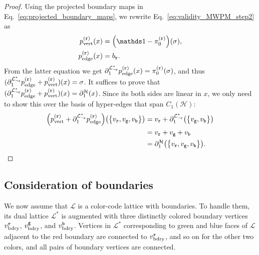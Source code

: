 \documentclass[a4paper,twocolumn,11pt,accepted=2025-01-21]{quantumarticle}
\theoremstyle{definition}
\theoremstyle{definition}
\theoremstyle{definition}
\begin{document}
\begin{proof}
    Using the projected boundary maps in Eq.~\eqref{eq:projected_boundary_maps}, we rewrite Eq.~\eqref{eq:validity_MWPM_step2} as
    \begin{align*}
        p_\mr{vert}^{(\rbs)} (x) &= \qty(\identity - \pi_0^{(\rbs)})(\sigma), \\
        p_\mr{edge}^{(\rbs)} (x) &= b_\rbs.
    \end{align*}
    From the latter equation we get $\partial_1^{\mathcal{L}_{\neg \texttt{r}}^*} p_{\mathrm{edge}}^{(\texttt{r})} (x) = \pi_0^{(\texttt{r})} (\sigma)$, and thus $(\partial_1^{\mathcal{L}_{\neg \texttt{r}}^*} p_{\mathrm{edge}}^{(\texttt{r})} + p_{\mathrm{vert}}^{(\texttt{r})}) (x) = \sigma$.
    It suffices to prove that $(\partial_1^{\mathcal{L}_{\neg \texttt{r}}^*}  p_{\mathrm{edge}}^{(\texttt{r})} + p_{\mathrm{vert}}^{(\texttt{r})})(x) = \partial_1^{\mathcal{H}}(x)$. 
    Since its both sides are linear in $x$, we only need to show this over the basis of hyper-edges that span $C_1(\mathcal{H})$:
    \begin{align*}
        \qty(p_{\mathrm{vert}}^{(\texttt{r})} + \partial_1^{\mathcal{L}_{\neg \texttt{r}}^*} p_{\mathrm{edge}}^{(\texttt{r})})\qty(\qty{v_{\texttt{r}},v_{\texttt{g}},v_{\texttt{b}}}) &= v_{\texttt{r}} + \partial_1^{\mathcal{L}_{\neg \texttt{r}}^*} \qty(\qty{v_{\texttt{g}},v_{\texttt{b}}}) \\
        &= v_{\texttt{r}} + v_{\texttt{g}} + v_{\texttt{b}} \\
        &= \partial_1^\mathcal{H}\qty(\qty{v_{\texttt{r}},v_{\texttt{g}},v_{\texttt{b}}}).
    \end{align*}
\end{proof}

\subsection{Consideration of boundaries \label{subapp:boundary_consideration}}

We now assume that $\mathcal{L}$ is a color-code lattice with boundaries.
To handle them, its dual lattice $\mathcal{L}^*$ is augmented with three distinctly colored boundary vertices $v_{\mathrm{bdry}}^{\texttt{r}}$, $v_{\mathrm{bdry}}^{\texttt{g}}$, and $v_{\mathrm{bdry}}^{\texttt{b}}$.
Vertices in $\mathcal{L}^*$ corresponding to green and blue faces of $\mathcal{L}$ adjacent to the red boundary are connected to $v_{\mathrm{bdry}}^{\texttt{r}}$, and so on for the other two colors, and all pairs of boundary vertices are connected.
\end{document}
